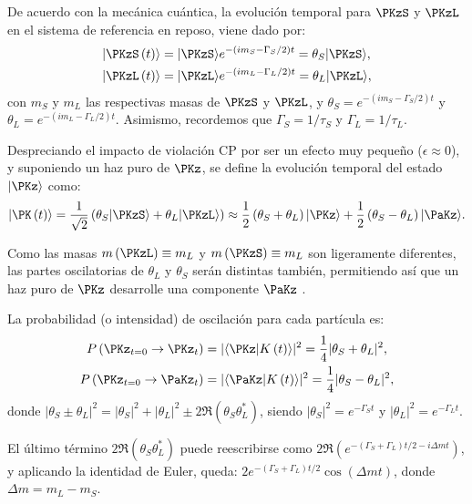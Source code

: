 De acuerdo con la mecánica cuántica, la evolución temporal para $\PKzS$ y $\PKzL$ en el sistema de referencia en reposo, viene dado por:
\begin{align}
|\PKzS\left(t\right)\rangle &= |\PKzS\rangle e^{-\left(im_{S}-\Gamma_{S}/2\right)t} = \theta_{S}|\PKzS\rangle , \\
|\PKzL\left(t\right)\rangle &= |\PKzL\rangle e^{-\left(im_{L}-\Gamma_{L}/2\right)t} = \theta_{L}|\PKzL\rangle , \label{eq:evtempKSKL}
\end{align}
con $m_{S}$ y $m_{L}$ las respectivas masas de $\PKzS$ y $\PKzL$, y $\theta_{S}=e^{-\left(im_{S}-\Gamma_{S}/2\right)t}$ y $\theta_{L}=e^{-\left(im_{L}-\Gamma_{L}/2\right)t}$. Asimismo, recordemos que $\Gamma_{S}=1/ \tau_S$ y $\Gamma_{L}=1/\tau_L$. 

Despreciando el impacto de violación CP por ser un efecto muy pequeño ($\epsilon \approx 0$), y suponiendo un haz puro de $\PKz$, se define la evolución temporal del estado $|\PKz\rangle$ como:
\begin{equation}
|\PK\left(t\right)\rangle=\dfrac{1}{\sqrt{2}}\left(\theta_{S}|\PKzS\rangle + \theta_{L}|\PKzL\rangle \right) \approx \dfrac{1}{2}\left(\theta_{S}+\theta_{L}\right)|\PKz\rangle + \dfrac{1}{2}\left(\theta_{S}-\theta_{L}\right)|\PaKz\rangle .
\end{equation}

Como las masas $m\left(\PKzL\right) \equiv m_{L}$ y $m\left(\PKzS\right) \equiv m_{L}$ son ligeramente diferentes, las partes oscilatorias de $\theta_{L}$ y $\theta_{S}$ serán distintas también, permitiendo así que un haz puro de $\PKz$ desarrolle una componente $\PaKz$ \cite{Thomson}.

La probabilidad (o intensidad) de oscilación para cada partícula es:
\begin{align}
P\left(\PKz_{t=0} \rightarrow \PKz_{t}\right)&= |\langle\PKz|K\left(t\right)\rangle|^2 =\dfrac{1}{4}|\theta_{S}+\theta_{L}|^2 ,\label{eq:prob1osci}\\
P\left(\PKz_{t=0} \rightarrow \PaKz_{t}\right)&= |\langle\PaKz|K\left(t\right)\rangle|^2 =\dfrac{1}{4}|\theta_{S}-\theta_{L}|^2 ,\label{eq:prob2osci}
\end{align}
donde $|\theta_{S} \pm \theta_{L}|^2=|\theta_{S}|^2+|\theta_{L}|^2 \pm 2\Re\left(\theta_{S}\theta_{L}^{\ast}\right)$, siendo $|\theta_{S}|^2=e^{-\Gamma_{S} t}$ y $|\theta_{L}|^2=e^{-\Gamma_{L} t}$. 

El último término $2\Re\left(\theta_{S}\theta_{L}^{\ast}\right)$ puede reescribirse como $2\Re\left(e^{-\left(\Gamma_{S}+\Gamma_{L}\right)t/2-i\Delta mt}\right)$, y aplicando la identidad de Euler, queda: $2e^{-\left(\Gamma_{S}+\Gamma_{L}\right)t/2} \cos \left(\Delta mt\right)$, donde $\Delta m = m_{L}-m_{S}$.

